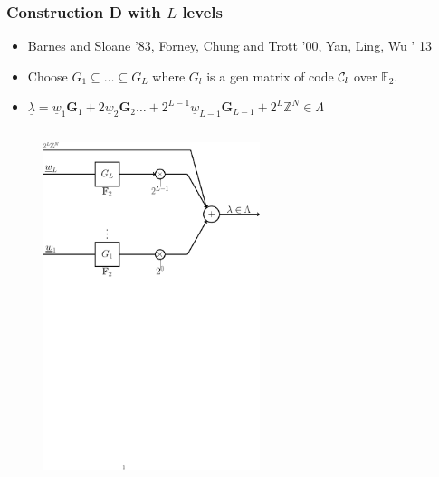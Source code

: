 \documentclass[10pt]{beamer}
\def\patha{../SCLDPC-lattices}
\begin{document}
\begin{frame}\frametitle{Construction D with $L$ levels}
\begin{itemize}
    \item Barnes and Sloane '83, Forney, Chung and Trott '00, Yan, Ling, Wu ' 13
				 \vspace{0.5em}
	 \item Choose  $G_{1}\subseteq \ldots \subseteq G_{L}$ where $G_{l}$ is a gen matrix of code $\mathcal{C}_{l}$ over $\mathbb{F}_{2}$.
				 \vspace{.5em}
	\item<2->  $  \underline{\lambda} = \underline{w}_1 \mathbf{G}_1 + 2 \underline{w}_2 \mathbf{G}_2 \ldots +2^{L-1} \underline{w}_{L-1} \mathbf{G}_{L-1} +2^{L}\mathbb{Z}^{N} \in \Lambda$
\end{itemize}
				\vspace{0.2in}
    \begin{columns}[t]      
 	      \begin{column}{0.6\textwidth}
			\onslide<2->	{
            \begin{figure}
			\includegraphics[width=2.5in]{lattice_Constr_D1.pdf}
            \end{figure}
            			}
        \end{column}

\begin{column}{0.39\textwidth}
	\begin{figure}
	\end{figure}
\end{column}
    \end{columns}    
\end{frame}
\end{document}
